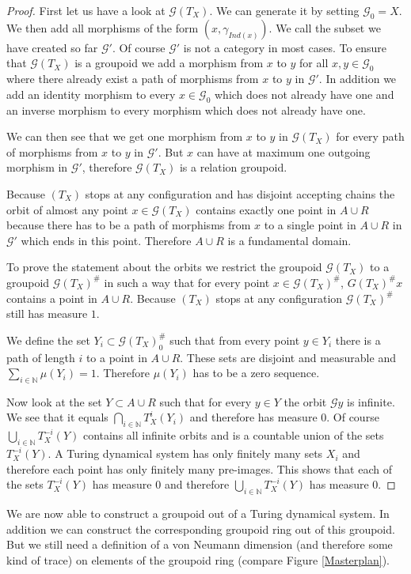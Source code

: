 \documentclass[12pt,a4paper]{scrartcl}
\theoremstyle{plain}
\theoremstyle{definition}
\numberwithin{equation}{section}
\newcommand{\N}{\mathbb{N}} %
\newcommand{\2}{\mathbb{Z} / 2 \mathbb{Z}}
\newcommand{\G}{\mathcal{G}}
\newcommand{\1}{\bar{1}}
\newcommand{\0}{\bar{0}}
\begin{document}
\begin{proof}
	First let us have a look at $\G (T_X)$. We can generate it by setting $\G_0 = X$. We then add all morphisms of the form $(x, \gamma_{Ind(x)})$. We call the subset we have created so far $\G'$. Of course $\G'$ is not a category in most cases. To ensure that $\G (T_X)$ is a groupoid we add a morphism from $x$ to $y$ for all $x, y \in \G_0$ where there already exist a path of morphisms from $x$ to $y$ in $\G'$. In addition we add an identity morphism to every $ x\in \G_0$ which does not already have one and an inverse morphism to every morphism which does not already have one. 
	
	We can then see that we get one morphism from $x$ to $y$ in $\G (T_X)$ for every path of morphisms from $x$ to $y$ in $\G'$. But $x$ can have at maximum one outgoing morphism in $\G'$, therefore $\G (T_X)$ is a relation groupoid.

	Because $(T_X)$ stops at any configuration and has disjoint accepting chains the orbit of almost any point $x \in \G (T_X)$ contains exactly one point in $A \cup R$ because there has to be a path of morphisms from $x$ to a single point in $A \cup R$ in $\G'$ which ends in this point. Therefore $A \cup R$ is a fundamental domain.
	
	To prove the statement about the orbits we restrict the groupoid $\G (T_X)$ to a groupoid $\G (T_X)^\#$ in such a way that for every point $x \in \G (T_X)^\#$, $G (T_X)^\# x$ contains a point in $A \cup R$. Because $(T_X)$ stops at any configuration $\G (T_X)^\#$ still has measure $1$.
	
	We define the set $Y_i \subset \G (T_X)_0^\#$ such that from every point $y \in Y_i$ there is a path of length $i$ to a point in $A \cup R$. These sets are disjoint and measurable and $\sum_{i \in \N} \mu(Y_i) = 1$. Therefore $\mu(Y_i)$ has to be a zero sequence.
	
	Now look at the set $Y \subset A \cup R$ such that for every $y \in Y$ the orbit $\G y$ is infinite. We see that it equals $\bigcap_{i \in \N} T_X^i(Y_i)$ and therefore has measure $0$. Of course $\bigcup_{i \in \N }T_X^{-i}(Y)$ contains all infinite orbits and  is a countable union of the sets $T_X^{-i}(Y)$. A Turing dynamical system has only finitely many sets $X_i$ and therefore each point has only finitely many pre-images. This shows that each of the sets $T_X^{-i}(Y)$ has measure $0$ and therefore $\bigcup_{i \in \N }T_X^{-i}(Y)$ has measure $0$.
\end{proof}
We are now able to construct a groupoid out of a Turing dynamical system. In addition we can construct the corresponding groupoid ring out of this groupoid. But we still need a definition of a von Neumann dimension (and therefore some kind of trace) on elements of the groupoid ring (compare Figure \ref{Masterplan}).
\end{document}

